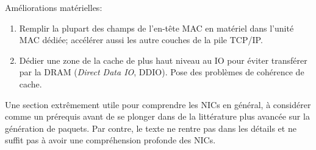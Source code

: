 Améliorations matérielles:
\begin{enumerate}
	\item{Remplir la plupart des champs de l'en-tête MAC en matériel dans l'unité MAC dédiée; accélérer aussi les autre couches de la pile TCP/IP.}
	\item{Dédier une zone de la cache de plus haut niveau au IO pour éviter transférer par la DRAM (\emph{Direct Data IO}, DDIO). Pose des problèmes de cohérence de cache.}
\end{enumerate}

 Une section extrêmement utile pour comprendre les NICs en général, à considérer comme un prérequis avant de se plonger dans de la littérature plus avancée sur la génération de paquets. Par contre, le texte ne rentre pas dans les détails et ne suffit pas à avoir une compréhension profonde des NICs.

\clearpage
